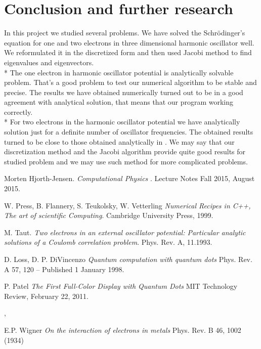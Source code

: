 \documentclass[10pt]{article}
\begin{document}
\newpage
\clearpage
\section{Conclusion and further research}\label{conc}

In this project we studied several problems. We have solved the Schr\"{o}dinger's equation for one and two electrons in three dimensional harmonic oscillator well. We reformulated it in the discretized form and then used Jacobi method to find eigenvalues and eigenvectors.\\*
The one electron in harmonic oscillator potential is analytically solvable problem. That's a good problem to test our numerical algorithm to be stable and precise. The results we have obtained numerically turned out to be in a good agreement with analytical solution, that means that our program working correctly. \\*
For two electrons in the harmonic oscillator potential we have analytically solution just for a definite number of oscillator frequencies. The obtained results turned to be close to those obtained analytically in \cite{three}. We may say that our discretization method and the Jacobi algorithm provide quite good results for studied problem and we may use such method for more complicated problems. 

\clearpage
\newpage
\begin{thebibliography}{2}
Morten Hjorth-Jensen. 
\textit{Computational Physics
}. 
Lecture Notes Fall 2015, August 2015.

W. Press, B. Flannery, S. Teukolsky, W. Vetterling 
\textit{Numerical Recipes in C++, The art of scientific Computing}. 
Cambridge University Press, 1999.

M. Taut. 
\textit{Two electrons in an external oscillator potential: Particular analytic solutions of a Coulomb correlation problem}.
Phys. Rev. A, 11.1993.

D. Loss, D. P. DiVincenzo
\textit{
Quantum computation with quantum dots
}
Phys. Rev. A 57, 120 – Published 1 January 1998.

P. Patel
\textit
{The First Full-Color Display with Quantum Dots
}
MIT Technology Review, February 22, 2011. 

, 

E.P. Wigner
\textit
{On the interaction of electrons in metals
}
Phys. Rev. B 46, 1002 (1934) 


 
\end{thebibliography}
\end{document}
